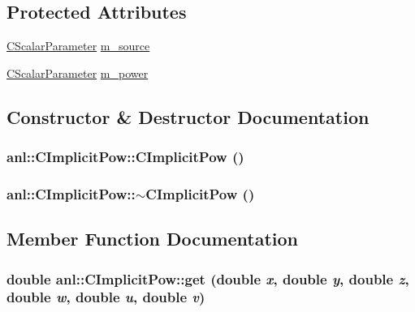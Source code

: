 \subsection*{Protected Attributes}
\begin{DoxyCompactItemize}
\item 
\hyperlink{classanl_1_1CScalarParameter}{CScalarParameter} \hyperlink{classanl_1_1CImplicitPow_aae11a9a743adf6158fe9190f2f358538}{m\_\-source}
\item 
\hyperlink{classanl_1_1CScalarParameter}{CScalarParameter} \hyperlink{classanl_1_1CImplicitPow_a583a37c58658b696b7352bb111429de5}{m\_\-power}
\end{DoxyCompactItemize}


\subsection{Constructor \& Destructor Documentation}
\hypertarget{classanl_1_1CImplicitPow_afa3eb17e6b117bae52797598a1d223b2}{
\subsubsection[{CImplicitPow}]{\setlength{\rightskip}{0pt plus 5cm}anl::CImplicitPow::CImplicitPow ()}}
\label{classanl_1_1CImplicitPow_afa3eb17e6b117bae52797598a1d223b2}
\hypertarget{classanl_1_1CImplicitPow_afa502e9f519d89a836f163cd5ac8fb3a}{
\subsubsection[{$\sim$CImplicitPow}]{\setlength{\rightskip}{0pt plus 5cm}anl::CImplicitPow::$\sim$CImplicitPow ()}}
\label{classanl_1_1CImplicitPow_afa502e9f519d89a836f163cd5ac8fb3a}


\subsection{Member Function Documentation}
\hypertarget{classanl_1_1CImplicitPow_abb17667145906c16e125ec7c5fb86461}{
\subsubsection[{get}]{\setlength{\rightskip}{0pt plus 5cm}double anl::CImplicitPow::get (double {\em x}, \/  double {\em y}, \/  double {\em z}, \/  double {\em w}, \/  double {\em u}, \/  double {\em v})}}
\label{classanl_1_1CImplicitPow_abb17667145906c16e125ec7c5fb86461}


